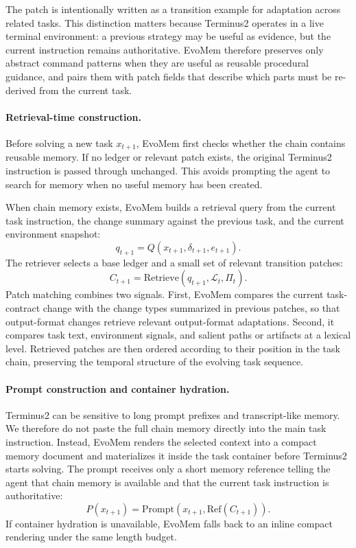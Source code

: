 \documentclass{llmxive}
\begin{document}
The patch is intentionally written as a transition example for adaptation across related tasks. This distinction matters because Terminus2 operates in a live terminal environment: a previous strategy may be useful as evidence, but the current instruction remains authoritative. EvoMem therefore preserves only abstract command patterns when they are useful as reusable procedural guidance, and pairs them with patch fields that describe which parts must be re-derived from the current task.

\paragraph{Retrieval-time construction.}
Before solving a new task $x_{t+1}$, EvoMem first checks whether the chain contains reusable memory. If no ledger or relevant patch exists, the original Terminus2 instruction is passed through unchanged. This avoids prompting the agent to search for memory when no useful memory has been created.

When chain memory exists, EvoMem builds a retrieval query from the current task instruction, the change summary against the previous task, and the current environment snapshot:
\[
q_{t+1}=Q(x_{t+1},\delta_{t+1},e_{t+1}).
\]
The retriever selects a base ledger and a small set of relevant transition patches:
\[
C_{t+1}=\mathrm{Retrieve}(q_{t+1},\mathcal{L}_t,\Pi_t).
\]
Patch matching combines two signals. First, EvoMem compares the current task-contract change with the change types summarized in previous patches, so that output-format changes retrieve relevant output-format adaptations. Second, it compares task text, environment signals, and salient paths or artifacts at a lexical level. Retrieved patches are then ordered according to their position in the task chain, preserving the temporal structure of the evolving task sequence.

\paragraph{Prompt construction and container hydration.}
Terminus2 can be sensitive to long prompt prefixes and transcript-like memory. We therefore do not paste the full chain memory directly into the main task instruction. Instead, EvoMem renders the selected context into a compact memory document and materializes it inside the task container before Terminus2 starts solving. The prompt receives only a short memory reference telling the agent that chain memory is available and that the current task instruction is authoritative:
\[
P(x_{t+1})=
\mathrm{Prompt}\!\left(x_{t+1},\mathrm{Ref}(C_{t+1})\right).
\]
If container hydration is unavailable, EvoMem falls back to an inline compact rendering under the same length budget.
\end{document}
